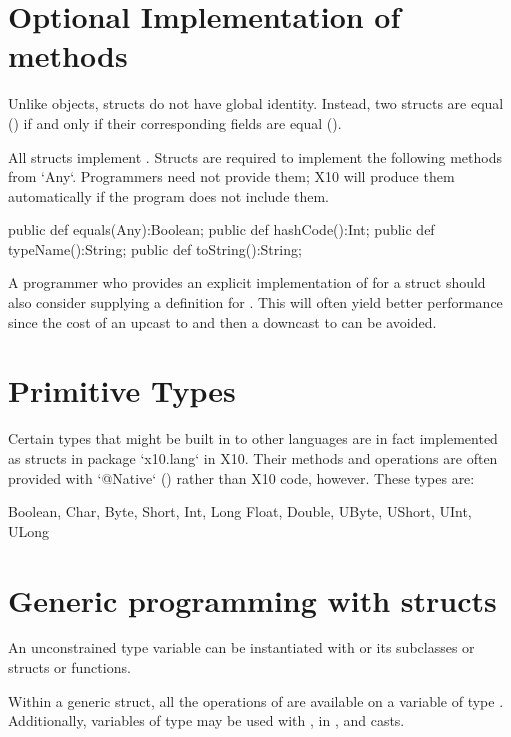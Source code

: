 \section{Optional Implementation of  methods}
\label{StructAnyMethods}

Unlike objects, structs do not have global identity. Instead, two
structs are equal (\Xcd{==}) if and only if their corresponding fields
are equal (\Xcd{==}). 

All structs implement . 
Structs are required to implement the following methods from \xcd`Any`.  
Programmers need not provide them; X10 will produce them automatically if 
the program does not include them. 
\begin{xten}
  public def equals(Any):Boolean;
  public def hashCode():Int;
  public def typeName():String;
  public def toString():String;  
\end{xten}


A programmer who provides an explicit implementation
of  for a struct  should also consider
supplying a definition for . This will often
yield better performance since the cost of an upcast to  and
then a downcast to  can be avoided.

\section{Primitive Types}

Certain types that might be built in to other languages are in fact
implemented as structs in package \xcd`x10.lang` in X10. Their methods and
operations are often provided with \xcd`@Native` () rather
than X10 code, however. These types are:
\begin{xten}
Boolean, Char, Byte, Short, Int, Long
Float, Double, UByte, UShort, UInt, ULong
\end{xten}
 
\section{Generic programming with structs}

An unconstrained type variable  can be instantiated with  or
its subclasses or structs or functions.

Within a generic struct, all the operations of  are available
on a variable of type . Additionally, variables of type  may
be used with \Xcd{==, !=}, in , and casts.

